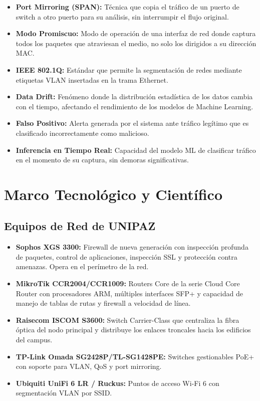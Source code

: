 \documentclass[12pt,letterpaper]{report}
\begin{document}
\begin{itemize}
  \item \textbf{Port Mirroring (SPAN):} Técnica que copia el tráfico de un puerto de switch a otro puerto para su análisis, sin interrumpir el flujo original.
  \item \textbf{Modo Promiscuo:} Modo de operación de una interfaz de red donde captura todos los paquetes que atraviesan el medio, no solo los dirigidos a su dirección MAC.
  \item \textbf{IEEE 802.1Q:} Estándar que permite la segmentación de redes mediante etiquetas VLAN insertadas en la trama Ethernet.
  \item \textbf{Data Drift:} Fenómeno donde la distribución estadística de los datos cambia con el tiempo, afectando el rendimiento de los modelos de Machine Learning.
  \item \textbf{Falso Positivo:} Alerta generada por el sistema ante tráfico legítimo que es clasificado incorrectamente como malicioso.
  \item \textbf{Inferencia en Tiempo Real:} Capacidad del modelo ML de clasificar tráfico en el momento de su captura, sin demoras significativas.
\end{itemize}

\section{Marco Tecnológico y Científico}

\subsection{Equipos de Red de UNIPAZ}

\begin{itemize}
  \item \textbf{Sophos XGS 3300:} Firewall de nueva generación con inspección profunda de paquetes, control de aplicaciones, inspección SSL y protección contra amenazas. Opera en el perímetro de la red.
  \item \textbf{MikroTik CCR2004/CCR1009:} Routers Core de la serie Cloud Core Router con procesadores ARM, múltiples interfaces SFP+ y capacidad de manejo de tablas de rutas y firewall a velocidad de línea.
  \item \textbf{Raisecom ISCOM S3600:} Switch Carrier-Class que centraliza la fibra óptica del nodo principal y distribuye los enlaces troncales hacia los edificios del campus.
  \item \textbf{TP-Link Omada SG2428P/TL-SG1428PE:} Switches gestionables PoE+ con soporte para VLAN, QoS y port mirroring.
  \item \textbf{Ubiquiti UniFi 6 LR / Ruckus:} Puntos de acceso Wi-Fi 6 con segmentación VLAN por SSID.
\end{itemize}
\end{document}
